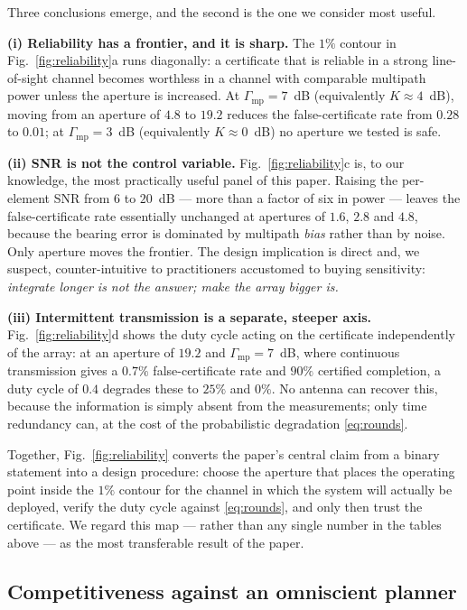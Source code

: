 \documentclass[journal,10pt]{IEEEtran}
\theoremstyle{definition}
\begin{document}
Three conclusions emerge, and the second is the one we consider most useful.

\noindent\textbf{(i) Reliability has a frontier, and it is sharp.} The $1\%$ contour in
Fig.~\ref{fig:reliability}a runs diagonally: a certificate that is reliable in a strong
line-of-sight channel becomes worthless in a channel with comparable multipath power unless the
aperture is increased. At $\Gamma_{\mathrm{mp}}=7$~dB (equivalently $K\approx4$~dB), moving from an aperture of $4.8$ to $19.2$ reduces the false-certificate rate from $0.28$ to $0.01$; at $\Gamma_{\mathrm{mp}}=3$~dB (equivalently $K\approx0$~dB) no aperture we tested is safe.

\noindent\textbf{(ii) SNR is not the control variable.} Fig.~\ref{fig:reliability}c is, to our
knowledge, the most practically useful panel of this paper. Raising the per-element SNR from $6$ to
$20$~dB --- more than a factor of six in power --- leaves the false-certificate rate essentially
unchanged at apertures of $1.6$, $2.8$ and $4.8$, because the bearing error is dominated by
multipath \emph{bias} rather than by noise. Only aperture moves the frontier. The design implication
is direct and, we suspect, counter-intuitive to practitioners accustomed to buying sensitivity:
\emph{integrate longer is not the answer; make the array bigger is.}

\noindent\textbf{(iii) Intermittent transmission is a separate, steeper axis.}
Fig.~\ref{fig:reliability}d shows the duty cycle acting on the certificate independently of the
array: at an aperture of $19.2$ and $\Gamma_{\mathrm{mp}}=7$~dB, where continuous transmission gives a $0.7\%$
false-certificate rate and $90\%$ certified completion, a duty cycle of $0.4$ degrades these to
$25\%$ and $0\%$. No antenna can recover this, because the information is simply absent from the
measurements; only time redundancy can, at the cost of the probabilistic degradation
\eqref{eq:rounds}.

Together, Fig.~\ref{fig:reliability} converts the paper's central claim from a binary statement
into a design procedure: choose the aperture that places the operating point inside the $1\%$
contour for the channel in which the system will actually be deployed, verify the duty cycle
against \eqref{eq:rounds}, and only then trust the certificate. We regard this map --- rather than
any single number in the tables above --- as the most transferable result of the paper.

\subsection{Competitiveness against an omniscient planner}
\end{document}
